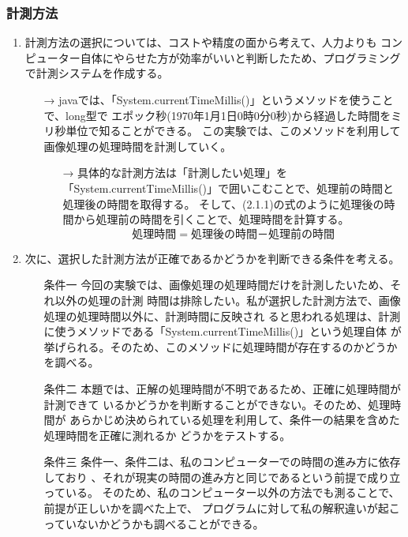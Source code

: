 \clearpage

\subsubsection{計測方法}

\begin{enumerate}
  \item 計測方法の選択については、コストや精度の面から考えて、人力よりも
  コンピューター自体にやらせた方が効率がいいと判断したため、プログラミングで計測システムを作成する。
  \begin{itemize}
    \item[→] javaでは、「System.currentTimeMillis()」というメソッドを使うことで、long型で
  エポック秒(1970年1月1日0時0分0秒)から経過した時間をミリ秒単位で知ることができる。
  この実験では、このメソッドを利用して画像処理の処理時間を計測していく。
  \begin{itemize}
    \item[→] 具体的な計測方法は「計測したい処理」を
  「System.currentTimeMillis()」で囲いこむことで、処理前の時間と処理後の時間を取得する。
  そして、(2.1.1)の式のように処理後の時間から処理前の時間を引くことで、処理時間を計算する。
  \begin{equation}
    処理時間　=　処理後の時間　－　処理前の時間
  \end{equation}
  \end{itemize}
  \end{itemize}
  \item 次に、選択した計測方法が正確であるかどうかを判断できる条件を考える。
  \begin{itemize}
    \setlength{\leftskip}{1.0cm}
    \item[条件一] 今回の実験では、画像処理の処理時間だけを計測したいため、それ以外の処理の計測
    時間は排除したい。私が選択した計測方法で、画像処理の処理時間以外に、計測時間に反映され
    ると思われる処理は、計測に使うメソッドである「System.currentTimeMillis()」という処理自体
    が挙げられる。そのため、このメソッドに処理時間が存在するのかどうかを調べる。
    \item[条件二] 本題では、正解の処理時間が不明であるため、正確に処理時間が計測できて
    いるかどうかを判断することができない。そのため、処理時間が
    あらかじめ決められている処理を利用して、条件一の結果を含めた処理時間を正確に測れるか
    どうかをテストする。
    \item[条件三] 条件一、条件二は、私のコンピューターでの時間の進み方に依存しており
    、それが現実の時間の進み方と同じであるという前提で成り立っている。
    そのため、私のコンピューター以外の方法でも測ることで、前提が正しいかを調べた上で、
    プログラムに対して私の解釈違いが起こっていないかどうかも調べることができる。
  \end{itemize}
  

\end{enumerate}
